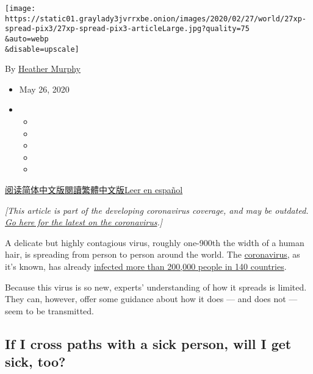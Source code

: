 \texttt{[image: https://static01.graylady3jvrrxbe.onion/images/2020/02/27/world/27xp-spread-pix3/27xp-spread-pix3-articleLarge.jpg?quality=75\\\&auto=webp\\\&disable=upscale]}

By \href{https://www.nytimes3xbfgragh.onion/by/heather-murphy}{Heather
Murphy}

\begin{itemize}
\item
  May 26, 2020
\item
  \begin{itemize}
  \item
  \item
  \item
  \item
  \item
  \end{itemize}
\end{itemize}

\href{https://cn.nytimes3xbfgragh.onion/health/20200303/coronavirus-how-it-spreads/}{阅读简体中文版}\href{https://cn.nytimes3xbfgragh.onion/health/20200303/coronavirus-how-it-spreads/zh-hant/}{閱讀繁體中文版}\href{https://www.nytimes3xbfgragh.onion/es/2020/03/03/espanol/ciencia-y-tecnologia/coronavirus-como-se-transmite.html}{Leer
en español}

\emph{{[}This article is part of the developing coronavirus coverage,
and may be outdated.}
\href{https://www.nytimes3xbfgragh.onion/news-event/coronavirus}{\emph{Go
here for the latest on the coronavirus}}\emph{.{]}}

A delicate but highly contagious virus, roughly one-900th the width of a
human hair, is spreading from person to person around the world. The
\href{https://www.nytimes3xbfgragh.onion/2020/03/03/world/coronavirus-news.html}{coronavirus},
as it's known, has already
\href{https://www.nytimes3xbfgragh.onion/interactive/2020/world/coronavirus-maps.html}{infected
more than 200,000 people in 140 countries}.

Because this virus is so new, experts' understanding of how it spreads
is limited. They can, however, offer some guidance about how it does ---
and does not --- seem to be transmitted.

\hypertarget{if-i-cross-paths-with-a-sick-person-will-i-get-sick-too}{%
\subsection{If I cross paths with a sick person, will I get sick,
too?}\label{if-i-cross-paths-with-a-sick-person-will-i-get-sick-too}}

